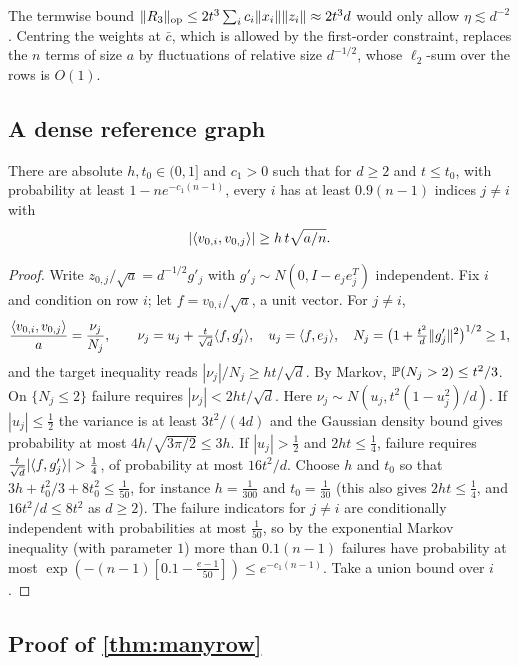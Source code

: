 \begin{remark}
The termwise bound $\lVert R_3\rVert_{\mathrm{op}}\le2t^3\sum_ic_i\lVert x_i\rVert\lVert z_i\rVert\approx2t^3d$
would only allow $\eta\lesssim d^{-2}$. Centring the weights at
$\bar c$, which is allowed by the first-order constraint, replaces the $n$
terms of size $a$ by fluctuations of relative size $d^{-1/2}$, whose
$\ell_2$-sum over the rows is $O(1)$.
\end{remark}

\subsection{A dense reference graph}

\begin{lemma}\label{lem:mr-dense}
There are absolute $h,t_0\in(0,1]$ and $c_1>0$ such that for $d\ge2$ and
$t\le t_0$, with
probability at least $1-ne^{-c_1(n-1)}$, every $i$ has at least $0.9(n-1)$
indices $j\ne i$ with
\[
 |\langle v_{0,i},v_{0,j}\rangle|\ge h\,t\sqrt{a/n}.
\]
\end{lemma}

\begin{proof}
Write $z_{0,j}/\sqrt a=d^{-1/2}g'_j$ with $g'_j\sim N(0,I-e_je_j^T)$
independent. Fix $i$ and condition on row $i$; let $f=v_{0,i}/\sqrt a$, a unit
vector. For $j\ne i$,
\[
 \frac{\langle v_{0,i},v_{0,j}\rangle}{a}=\frac{\nu_j}{N_j},\qquad
 \nu_j=u_j+\tfrac t{\sqrt d}\langle f,g'_j\rangle,\quad u_j=\langle f,e_j\rangle,\quad
 N_j=\bigl(1+\tfrac{t^2}d\lVert g'_j\rVert^2\bigr)^{1/2}\ge1,
\]
and the target inequality reads $|\nu_j|/N_j\ge ht/\sqrt d$. By Markov,
$\mathbb P(N_j>2)\le t^2/3$. On $\{N_j\le2\}$ failure requires
$|\nu_j|<2ht/\sqrt d$. Here $\nu_j\sim N(u_j,t^2(1-u_j^2)/d)$. If $|u_j|\le\frac12$
the variance is at least $3t^2/(4d)$ and the Gaussian density bound gives
probability at most $4h/\sqrt{3\pi/2}\le3h$. If $|u_j|>\frac12$ and $2ht\le\frac14$,
failure requires $\frac t{\sqrt d}|\ip f{g'_j}|>\frac14$, of probability at most
$16t^2/d$. Choose $h$ and $t_0$ so that $3h+t_0^2/3+8t_0^2\le\frac1{50}$, for instance
$h=\frac1{300}$ and $t_0=\frac1{30}$ (this also gives
$2ht\le\frac14$, and $16t^2/d\le8t^2$ as $d\ge2$). The
failure indicators for $j\ne i$ are conditionally independent with
probabilities at most $\frac1{50}$, so by the exponential Markov inequality
(with parameter $1$) more than $0.1(n-1)$ failures have probability at most
$\exp(-(n-1)[0.1-\frac{e-1}{50}])\le e^{-c_1(n-1)}$. Take a union bound over
$i$.
\end{proof}

\subsection{Proof of \texorpdfstring{\cref{thm:manyrow}}{Theorem}}

